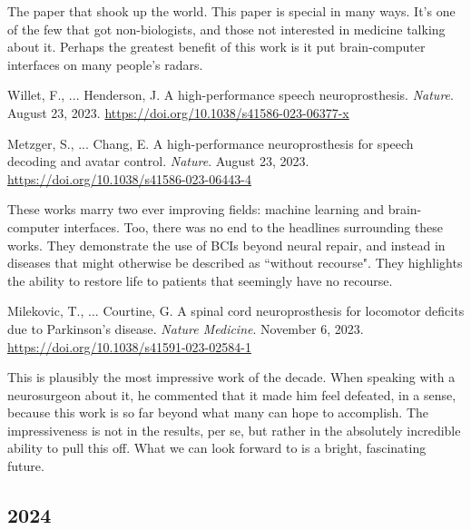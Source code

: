 \begin{adjustwidth}{1cm}{1cm}
The paper that shook up the world. This paper is special in many ways. It's one of the few that got non-biologists, and those not interested in medicine talking about it. Perhaps the greatest benefit of this work is it put brain-computer interfaces on many people's radars. \newline
\end{adjustwidth}

Willet, F., ... Henderson, J. A high-performance speech neuroprosthesis. \textit{Nature}. August 23, 2023. \url{https://doi.org/10.1038/s41586-023-06377-x}\newline

Metzger, S., ... Chang, E. A high-performance neuroprosthesis for speech decoding and avatar control. \textit{Nature}. August 23, 2023. \url{https://doi.org/10.1038/s41586-023-06443-4}

\begin{adjustwidth}{1cm}{1cm}
These works marry two ever improving fields: machine learning and brain-computer interfaces. Too, there was no end to the headlines surrounding these works. They demonstrate the use of BCIs beyond neural repair, and instead in diseases that might otherwise be described as ``without recourse". They highlights the ability to restore life to patients that seemingly have no recourse.  \newline
\end{adjustwidth}


Milekovic, T., ... Courtine, G. A spinal cord neuroprosthesis for locomotor deficits due to Parkinson’s disease. \textit{Nature Medicine}. November 6, 2023. \url{https://doi.org/10.1038/s41591-023-02584-1}

\begin{adjustwidth}{1cm}{1cm}
This is plausibly the most impressive work of the decade. When speaking with a neurosurgeon about it, he commented that it made him feel defeated, in a sense, because this work is so far beyond what many can hope to accomplish. The impressiveness is not in the results, per se, but rather in the absolutely incredible ability to pull this off. What we can look forward to is a bright, fascinating future. \newline
\end{adjustwidth}


\subsection{2024}

